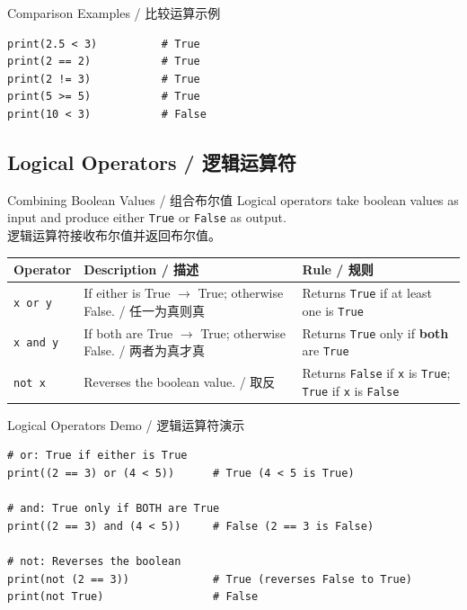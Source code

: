 \documentclass[11pt,a4paper]{report}
\let\oldtexttt\texttt
\renewcommand{\texttt}[1]{\textcolor{mainblue}{\oldtexttt{#1}}}
\begin{document}
\begin{examplebox}{Comparison Examples / 比较运算示例}
\begin{lstlisting}
print(2.5 < 3)          # True
print(2 == 2)           # True
print(2 != 3)           # True
print(5 >= 5)           # True
print(10 < 3)           # False
\end{lstlisting}
\end{examplebox}

\subsection{Logical Operators / 逻辑运算符}

\begin{concept}{Combining Boolean Values / 组合布尔值}
    Logical operators take boolean values as input and produce either \texttt{True} or \texttt{False} as output. \\
    逻辑运算符接收布尔值并返回布尔值。
\end{concept}

\medskip
\centering
\renewcommand{\arraystretch}{1.5}
\begin{tabularx}{\textwidth}{@{}l>{\raggedright\arraybackslash}X>{\raggedright\arraybackslash}X@{}}
\toprule
\textbf{Operator} & \textbf{Description / 描述} & \textbf{Rule / 规则} \\ \midrule
\texttt{x or y}  & If either is True $\rightarrow$ True; otherwise False. / 任一为真则真 & Returns \texttt{True} if at least one is \texttt{True} \\
\texttt{x and y} & If both are True $\rightarrow$ True; otherwise False. / 两者为真才真 & Returns \texttt{True} only if \textbf{both} are \texttt{True} \\
\texttt{not x}   & Reverses the boolean value. / 取反 & Returns \texttt{False} if \texttt{x} is \texttt{True}; \texttt{True} if \texttt{x} is \texttt{False} \\ \bottomrule
\end{tabularx}
\medskip

\begin{examplebox}{Logical Operators Demo / 逻辑运算符演示}
\begin{lstlisting}
# or: True if either is True
print((2 == 3) or (4 < 5))      # True (4 < 5 is True)

# and: True only if BOTH are True
print((2 == 3) and (4 < 5))     # False (2 == 3 is False)

# not: Reverses the boolean
print(not (2 == 3))             # True (reverses False to True)
print(not True)                 # False
\end{lstlisting}
\end{examplebox}
\end{document}
